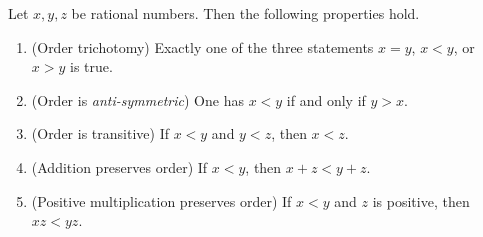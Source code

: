 \begin{proposition}  \label{prop 4.2.9}
Let \(x, y, z\) be rational numbers.
Then the following properties hold.
\begin{enumerate}
    \item {}
        (Order trichotomy) Exactly one of the three statements \(x = y\), \(x < y\), or \(x > y\) is true.
    \item {}
        (Order is \emph{anti-symmetric}) One has \(x < y\) if and only if \(y > x\).
    \item {}
        (Order is transitive) If \(x < y\) and \(y < z\), then \(x < z\).
    \item {}
        (Addition preserves order) If \(x < y\), then \(x + z < y + z\).
    \item {}
        (Positive multiplication preserves order) If \(x<y\) and \(z\) is positive, then \(xz < yz\).
\end{enumerate}
\end{proposition}


